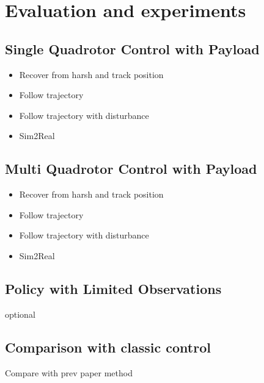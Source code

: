 \chapter{Evaluation and experiments}
\section{Single Quadrotor Control with Payload}
\begin{itemize}
    \item Recover from harsh and track position
    \item Follow trajectory
    \item Follow trajectory with disturbance
    \item Sim2Real
\end{itemize}
\section{Multi Quadrotor Control with Payload}
\begin{itemize}
    \item Recover from harsh and track position
    \item Follow trajectory
    \item Follow trajectory with disturbance
    \item Sim2Real
\end{itemize}
\section{Policy with Limited Observations}
optional
\section{Comparison with classic control}
Compare with prev paper method \autocite{Wahba2024}
